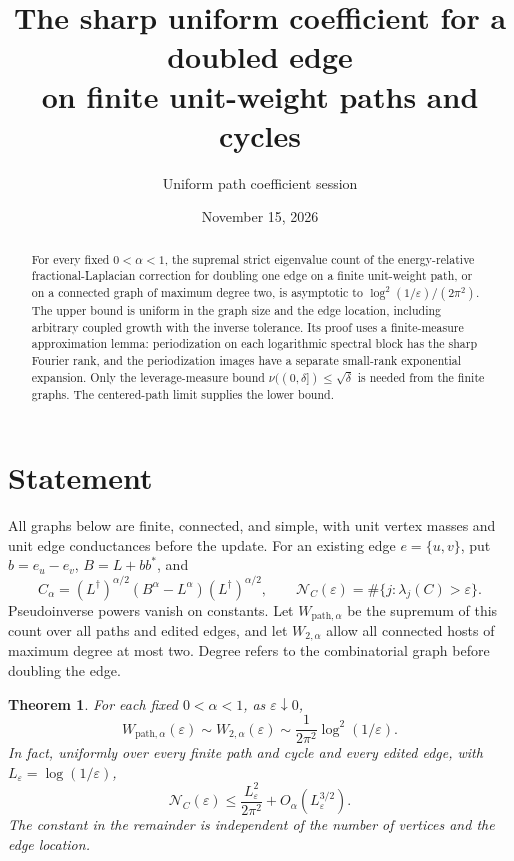 \documentclass[11pt]{article}
\title{The sharp uniform coefficient for a doubled edge\protect\\
on finite unit-weight paths and cycles}
\author{Uniform path coefficient session}
\date{November 15, 2026}
\newtheorem{theorem}{Theorem}[section]
\newcommand{\N}{\mathcal N}
\begin{document}
\maketitle

\begin{abstract}
For every fixed $0<\alpha<1$, the supremal strict eigenvalue count of
the energy-relative fractional-Laplacian correction for doubling one
edge on a finite unit-weight path, or on a connected graph of maximum
degree two, is asymptotic to
$\log^2(1/\varepsilon)/(2\pi^2)$.
The upper bound is uniform in the graph size and the edge location,
including arbitrary coupled growth with the inverse tolerance.
Its proof uses a finite-measure approximation lemma: periodization on
each logarithmic spectral block has the sharp Fourier rank, and the
periodization images have a separate small-rank exponential expansion.
Only the leverage-measure bound
$\nu((0,\delta])\le\sqrt\delta$ is needed from the finite graphs.
The centered-path limit supplies the lower bound.
\end{abstract}

\section{Statement}
All graphs below are finite, connected, and simple, with unit vertex
masses and unit edge conductances before the update. For an existing
edge $e=\{u,v\}$, put $b=e_u-e_v$, $B=L+bb^*$, and
\[
 C_\alpha=(L^\dagger)^{\alpha/2}
                  (B^\alpha-L^\alpha)(L^\dagger)^{\alpha/2},
 \qquad
 \N_C(\varepsilon)=\#\{j:\lambda_j(C)>\varepsilon\}.
\]
Pseudoinverse powers vanish on constants. Let
$W_{\mathrm{path},\alpha}$ be the supremum of this count over all paths
and edited edges, and let $W_{2,\alpha}$ allow all connected hosts of
maximum degree at most two. Degree refers to the combinatorial graph
before doubling the edge.

\begin{theorem}\label{thm:main}
For each fixed $0<\alpha<1$, as $\varepsilon\downarrow0$,
\[
 W_{\mathrm{path},\alpha}(\varepsilon)
 \sim W_{2,\alpha}(\varepsilon)
 \sim \frac{1}{2\pi^2}\log^2(1/\varepsilon).
\]
In fact, uniformly over every finite path and cycle and every edited
edge, with $L_\varepsilon=\log(1/\varepsilon)$,
\begin{equation}\label{eq:quantitative}
 \N_C(\varepsilon)
 \le \frac{L_\varepsilon^2}{2\pi^2}
                  +O_\alpha(L_\varepsilon^{3/2}).
\end{equation}
The constant in the remainder is independent of the number of
vertices and the edge location.
\end{theorem}
\end{document}
